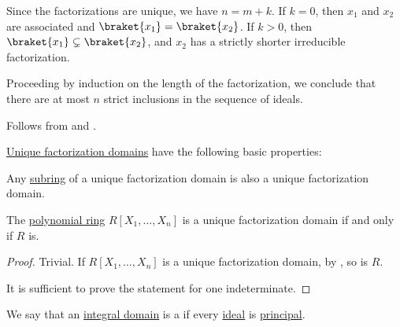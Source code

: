 \begin{defproof}
  Since the factorizations are unique, we have \( n = m + k \). If \( k = 0 \), then \( x_1 \) and \( x_2 \) are associated and \( \braket{ x_1 } = \braket{ x_2 } \). If \( k > 0 \), then \( \braket{ x_1 } \subsetneq \braket{ x_2 } \), and \( x_2 \) has a strictly shorter irreducible factorization.

  Proceeding by induction on the length of the factorization, we conclude that there are at most \( n \) strict inclusions in the sequence of ideals.

   Follows from  and .
\end{defproof}

\begin{proposition}\label{thm:def:unique_factorization_domain/properties}
  \hyperref[def:unique_factorization_domain]{Unique factorization domains} have the following basic properties:
  \begin{thmenum}
     Any \hyperref[def:ring/submodel]{subring} of a unique factorization domain is also a unique factorization domain.

     The \hyperref[def:polynomial_semiring]{polynomial ring} \( R[X_1, \ldots, X_n] \) is a unique factorization domain if and only if \( R \) is.
  \end{thmenum}
\end{proposition}
\begin{proof}
   Trivial.
  \SufficiencySubProof* If \( R[X_1, \ldots, X_n] \) is a unique factorization domain, by , so is \( R \).

  \NecessitySubProof* It is sufficient to prove the statement for one indeterminate.
\end{proof}

\begin{definition}\label{def:principal_ideal_domain}
  We say that an \hyperref[def:integral_domain]{integral domain} is a  if every \hyperref[def:semiring_ideal]{ideal} is \hyperref[def:semiring_ideal/principal]{principal}.
\end{definition}

